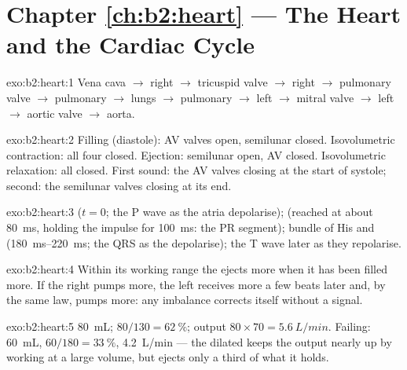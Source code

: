 \section*{Chapter \ref{ch:b2:heart} --- The Heart and the Cardiac Cycle}

\begin{solution}{exo:b2:heart:1}
Vena cava $\to$ right  $\to$ tricuspid valve $\to$ right
 $\to$ pulmonary valve $\to$ pulmonary  $\to$ lungs
$\to$ pulmonary  $\to$ left  $\to$ mitral valve $\to$ left
 $\to$ aortic valve $\to$ aorta.
\end{solution}

\begin{solution}{exo:b2:heart:2}
Filling (diastole): AV valves open, semilunar closed. Isovolumetric
contraction: all four closed. Ejection: semilunar open, AV closed.
Isovolumetric relaxation: all closed. First sound: the AV valves
closing at the start of systole; second: the semilunar valves
closing at its end.
\end{solution}

\begin{solution}{exo:b2:heart:3}
 ($t = 0$; the P wave as the atria depolarise);
 (reached at about \qty{80}{ms}, holding the
impulse for \qty{100}{ms}: the PR segment); bundle of His and
 (\qtyrange{180}{220}{ms}; the QRS as the 
depolarise); the T wave later as they repolarise.
\end{solution}

\begin{solution}{exo:b2:heart:4}
Within its working range the  ejects more when it has been
filled more. If the right  pumps more, the left receives
more a few beats later and, by the same law, pumps more: any
imbalance corrects itself without a signal.
\end{solution}

\begin{solution}{exo:b2:heart:5}
 \qty{80}{mL};  $80/130 = \qty{62}{\%}$;
output $80\times 70 = \qty{5.6}{L/min}$. Failing: \qty{60}{mL},
$60/180 = \qty{33}{\%}$, \qty{4.2}{L/min} --- the dilated 
keeps the output nearly up by working at a large volume, but ejects
only a third of what it holds.
\end{solution}

